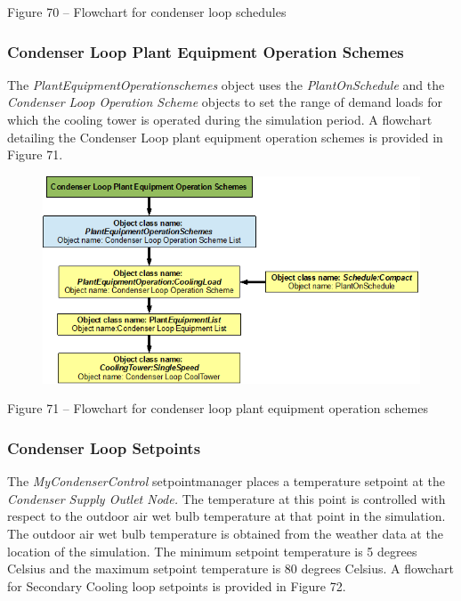Figure 70 -- Flowchart for condenser loop schedules

\subsubsection{Condenser Loop Plant Equipment Operation Schemes}\label{condenser-loop-plant-equipment-operation-schemes}

The \emph{PlantEquipmentOperationschemes} object uses the \emph{PlantOnSchedule} and the \emph{Condenser Loop Operation Scheme} objects to set the range of demand loads for which the cooling tower is operated during the simulation period. A flowchart detailing the Condenser Loop plant equipment operation schemes is provided in Figure 71.

\begin{figure}[htbp]
\centering
\includegraphics{media/image071.png}
\caption{}
\end{figure}

Figure 71 -- Flowchart for condenser loop plant equipment operation schemes

\subsubsection{Condenser Loop Setpoints}\label{condenser-loop-setpoints}

The \emph{MyCondenserControl} setpointmanager places a temperature setpoint at the \emph{Condenser Supply Outlet Node.} The temperature at this point is controlled with respect to the outdoor air wet bulb temperature at that point in the simulation. The outdoor air wet bulb temperature is obtained from the weather data at the location of the simulation. The minimum setpoint temperature is 5 degrees Celsius and the maximum setpoint temperature is 80 degrees Celsius. A flowchart for Secondary Cooling loop setpoints is provided in Figure 72.


